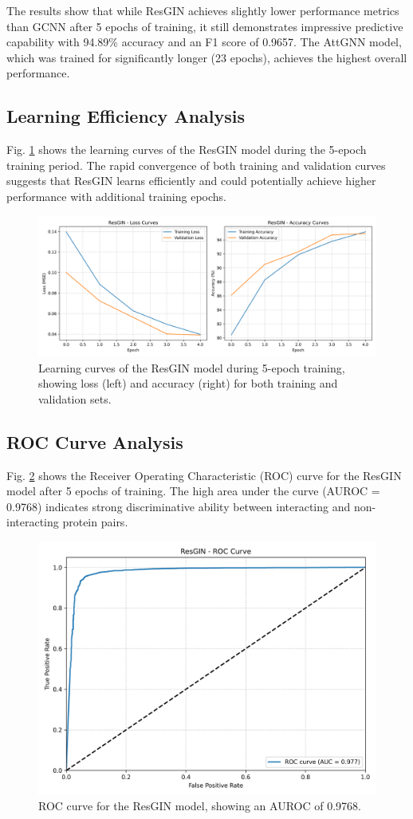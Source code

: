 \documentclass[conference]{IEEEtran}
\begin{document}
The results show that while ResGIN achieves slightly lower performance metrics than GCNN after 5 epochs of training, it still demonstrates impressive predictive capability with 94.89\% accuracy and an F1 score of 0.9657. The AttGNN model, which was trained for significantly longer (23 epochs), achieves the highest overall performance.

\subsection{Learning Efficiency Analysis}
Fig. \ref{fig:learning_curves} shows the learning curves of the ResGIN model during the 5-epoch training period. The rapid convergence of both training and validation curves suggests that ResGIN learns efficiently and could potentially achieve higher performance with additional training epochs.

\begin{figure}[htbp]
\centering
\includegraphics[width=0.8\linewidth]{resgin_test/ResGIN_learning_curves.png}
\caption{Learning curves of the ResGIN model during 5-epoch training, showing loss (left) and accuracy (right) for both training and validation sets.}
\label{fig:learning_curves}
\end{figure}

\subsection{ROC Curve Analysis}
Fig. \ref{fig:roc_curve} shows the Receiver Operating Characteristic (ROC) curve for the ResGIN model after 5 epochs of training. The high area under the curve (AUROC = 0.9768) indicates strong discriminative ability between interacting and non-interacting protein pairs.

\begin{figure}[htbp]
\centering
\includegraphics[width=0.5\linewidth]{resgin_test/ResGIN_roc_curve.png}
\caption{ROC curve for the ResGIN model, showing an AUROC of 0.9768.}
\label{fig:roc_curve}
\end{figure}
\end{document}
